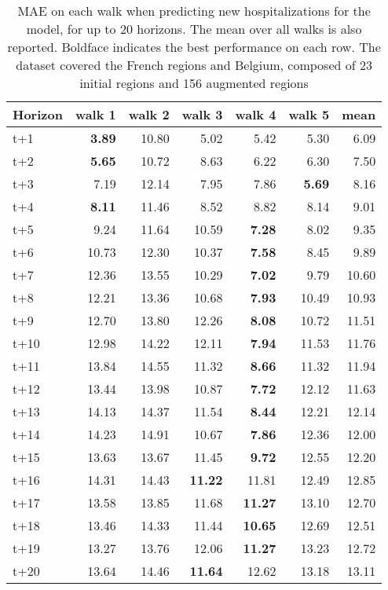 \begin{table}[H]
\centering
\caption{MAE on each walk when predicting new hospitalizations for the model, for up to 20 horizons. The mean over all walks is also reported. Boldface indicates the best performance on each row. The dataset covered the French regions and Belgium, composed of 23 initial regions and 156 augmented regions }
\label{tab:MAE_walk_dense_model}
\begin{tabular}{lrrrrrr}
\toprule
Horizon &  walk 1 &  walk 2 &  walk 3 &  walk 4 &  walk 5 &  mean \\
\midrule
t+1  & \textbf{3.89}  & 10.80  & 5.02  & 5.42  & 5.30  & 6.09  \\
t+2  & \textbf{5.65}  & 10.72  & 8.63  & 6.22  & 6.30  & 7.50  \\
t+3  & 7.19  & 12.14  & 7.95  & 7.86  & \textbf{5.69}  & 8.16  \\
t+4  & \textbf{8.11}  & 11.46  & 8.52  & 8.82  & 8.14  & 9.01  \\
t+5  & 9.24  & 11.64  & 10.59  & \textbf{7.28}  & 8.02  & 9.35  \\
t+6  & 10.73  & 12.30  & 10.37  & \textbf{7.58}  & 8.45  & 9.89  \\
t+7  & 12.36  & 13.55  & 10.29  & \textbf{7.02}  & 9.79  & 10.60  \\
t+8  & 12.21  & 13.36  & 10.68  & \textbf{7.93}  & 10.49  & 10.93  \\
t+9  & 12.70  & 13.80  & 12.26  & \textbf{8.08}  & 10.72  & 11.51  \\
t+10  & 12.98  & 14.22  & 12.11  & \textbf{7.94}  & 11.53  & 11.76  \\
t+11  & 13.84  & 14.55  & 11.32  & \textbf{8.66}  & 11.32  & 11.94  \\
t+12  & 13.44  & 13.98  & 10.87  & \textbf{7.72}  & 12.12  & 11.63  \\
t+13  & 14.13  & 14.37  & 11.54  & \textbf{8.44}  & 12.21  & 12.14  \\
t+14  & 14.23  & 14.91  & 10.67  & \textbf{7.86}  & 12.36  & 12.00  \\
t+15  & 13.63  & 13.67  & 11.45  & \textbf{9.72}  & 12.55  & 12.20  \\
t+16  & 14.31  & 14.43  & \textbf{11.22}  & 11.81  & 12.49  & 12.85  \\
t+17  & 13.58  & 13.85  & 11.68  & \textbf{11.27}  & 13.10  & 12.70  \\
t+18  & 13.46  & 14.33  & 11.44  & \textbf{10.65}  & 12.69  & 12.51  \\
t+19  & 13.27  & 13.76  & 12.06  & \textbf{11.27}  & 13.23  & 12.72  \\
t+20  & 13.64  & 14.46  & \textbf{11.64}  & 12.62  & 13.18  & 13.11  \\

\bottomrule
\end{tabular}
\end{table}
